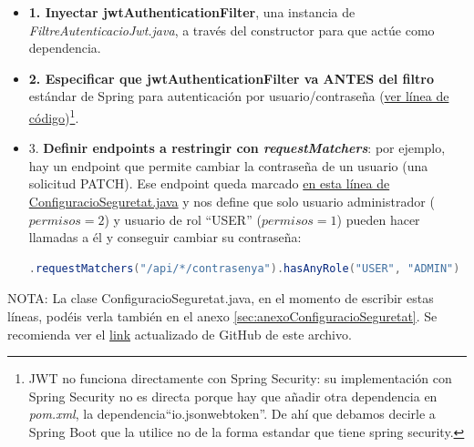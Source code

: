 \documentclass[a4paper,12pt]{report}
\begin{document}
		
		\begin{itemize}
		\setlength{\itemsep}{-.3em}
		 
		 
		\item \textbf{1. Inyectar jwtAuthenticationFilter}, una instancia de \textit{FiltreAutenticacioJwt.java}, a través del constructor para que actúe como dependencia.
		 
		\item \textbf{2. Especificar que jwtAuthenticationFilter va ANTES del filtro} estándar de Spring para autenticación por usuario/contraseña (\href{https://github.com/blackcub3s/mercApp/blob/db26ff53664be55223c793cf9b52ade87688be45/APP%20WEB/__springboot__produccio__/app/src/main/java/miApp/app/seguretat/ConfiguracioSeguretat.java#L41}{ver línea de código})\footnote{JWT no funciona directamente con Spring Security: su implementación con Spring Security no es directa porque hay que añadir otra dependencia en \textit{pom.xml}, la dependencia``io.jsonwebtoken''. De ahí que debamos decirle a Spring Boot que la utilice no de la forma estandar que tiene spring security.}. 
		
		\item 3. \textbf{Definir endpoints a restringir con \textit{requestMatchers}}: por ejemplo, hay un endpoint que permite cambiar la contraseña de un usuario (una solicitud PATCH). Ese endpoint queda marcado  \href{https://github.com/blackcub3s/mercApp/blob/db26ff53664be55223c793cf9b52ade87688be45/APP%20WEB/__springboot__produccio__/app/src/main/java/miApp/app/seguretat/ConfiguracioSeguretat.java#L34}{en esta línea de ConfiguracioSeguretat.java} y nos define que solo usuario administrador ($permisos = 2$) y usuario de rol ``USER'' ($permisos = 1$) pueden hacer llamadas a él y conseguir cambiar su contraseña:
		
\begin{lstlisting}[language=java, basicstyle=\ttfamily\footnotesize, keywordstyle=\color{magenta}]
.requestMatchers("/api/*/contrasenya").hasAnyRole("USER", "ADMIN")
\end{lstlisting}


		\end{itemize}

			NOTA: La clase ConfiguracioSeguretat.java, en el momento de escribir estas líneas, podéis verla también en el anexo \ref{sec:anexoConfiguracioSeguretat}. Se recomienda ver el \href{https://github.com/blackcub3s/mercApp/blob/main/APP%20WEB/__springboot__produccio__/app/src/main/java/miApp/app/seguretat/ConfiguracioSeguretat.java}{link} actualizado de GitHub de este archivo.
		
\end{document}
